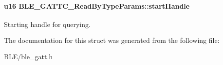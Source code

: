 \paragraph[{\texorpdfstring{start\+Handle}{startHandle}}]{\setlength{\rightskip}{0pt plus 5cm}u16 B\+L\+E\+\_\+\+G\+A\+T\+T\+C\+\_\+\+Read\+By\+Type\+Params\+::start\+Handle}\hypertarget{struct_b_l_e___g_a_t_t_c___read_by_type_params_a418d83136345db4edd07f0218a5ffcb8}{}\label{struct_b_l_e___g_a_t_t_c___read_by_type_params_a418d83136345db4edd07f0218a5ffcb8}
Starting handle for querying. 

The documentation for this struct was generated from the following file\+:\begin{DoxyCompactItemize}
\item 
B\+L\+E/ble\+\_\+gatt.\+h\end{DoxyCompactItemize}
